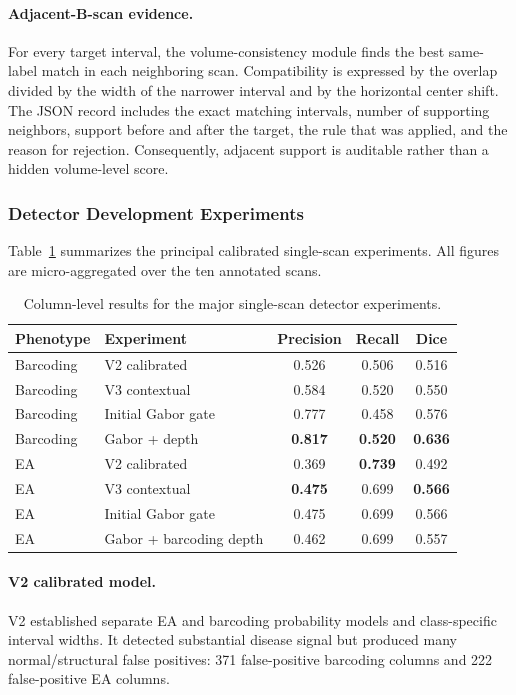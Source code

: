 \documentclass[11pt]{article}
\begin{document}
\paragraph{Adjacent-B-scan evidence.}
For every target interval, the volume-consistency module finds the best
same-label match in each neighboring scan.  Compatibility is expressed by the
overlap divided by the width of the narrower interval and by the horizontal
center shift.  The JSON record includes the exact matching intervals, number
of supporting neighbors, support before and after the target, the rule that
was applied, and the reason for rejection.  Consequently, adjacent support is
auditable rather than a hidden volume-level score.

\subsubsection{Detector Development Experiments}

Table~\ref{tab:detector_experiments} summarizes the principal calibrated
single-scan experiments.  All figures are micro-aggregated over the ten
annotated scans.

\begin{table}[H]
\centering
\small
\begin{tabular}{llccc}
\toprule
\textbf{Phenotype} & \textbf{Experiment} & \textbf{Precision} &
\textbf{Recall} & \textbf{Dice} \\
\midrule
Barcoding & V2 calibrated & 0.526 & 0.506 & 0.516 \\
Barcoding & V3 contextual & 0.584 & 0.520 & 0.550 \\
Barcoding & Initial Gabor gate & 0.777 & 0.458 & 0.576 \\
Barcoding & Gabor + depth & \textbf{0.817} & \textbf{0.520} & \textbf{0.636} \\
\midrule
EA & V2 calibrated & 0.369 & \textbf{0.739} & 0.492 \\
EA & V3 contextual & \textbf{0.475} & 0.699 & \textbf{0.566} \\
EA & Initial Gabor gate & 0.475 & 0.699 & 0.566 \\
EA & Gabor + barcoding depth & 0.462 & 0.699 & 0.557 \\
\bottomrule
\end{tabular}
\caption{Column-level results for the major single-scan detector experiments.}
\label{tab:detector_experiments}
\end{table}

\paragraph{V2 calibrated model.}
V2 established separate EA and barcoding probability models and class-specific
interval widths.  It detected substantial disease signal but produced many
normal/structural false positives: 371 false-positive barcoding columns and
222 false-positive EA columns.
\end{document}
